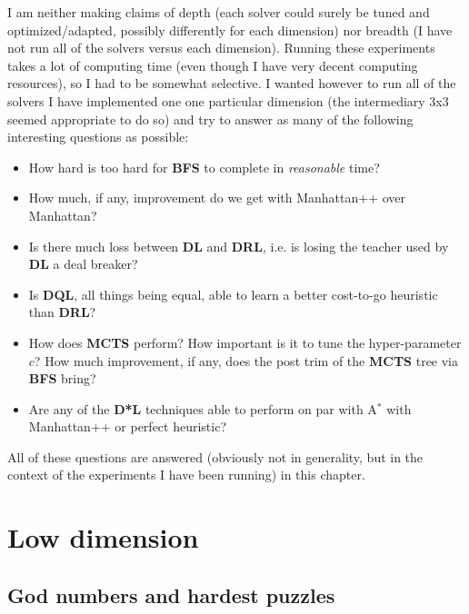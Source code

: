 I am neither making claims of depth (each solver could surely be tuned and optimized/adapted, possibly differently for each dimension) nor breadth (I have not run all of the solvers versus each dimension). Running these experiments takes a lot of computing time (even though I have very decent computing resources), so I had to be somewhat selective. I wanted however to run all of the solvers I have implemented one one particular dimension (the intermediary 3x3 seemed appropriate to do so) and try to answer as many of the following interesting questions as possible:
\begin{itemize}
\item How hard is too hard for \textbf{BFS} to complete in \textit{reasonable} time?
\item How much, if any, improvement do we get with Manhattan++ over Manhattan?
\item Is there much loss between \textbf{DL} and \textbf{DRL}, i.e. is losing the teacher used by \textbf{DL} a deal breaker?
\item Is \textbf{DQL}, all things being equal, able to learn a better cost-to-go heuristic than \textbf{DRL}?
\item How does \textbf{MCTS} perform? How important is it to tune the hyper-parameter $c$? How much improvement, if any, does the post trim of the \textbf{MCTS} tree via \textbf{BFS} bring?
\item Are any of the \textbf{D*L} techniques able to perform on par with A$^{*}$ with Manhattan++ or perfect heuristic?
\end{itemize}
All of these questions are answered (obviously not in generality, but in the context of the experiments I have been running) in this chapter.












\section{Low dimension}
\label{sec:SPLowDimension}

\subsection{God numbers and hardest puzzles}

